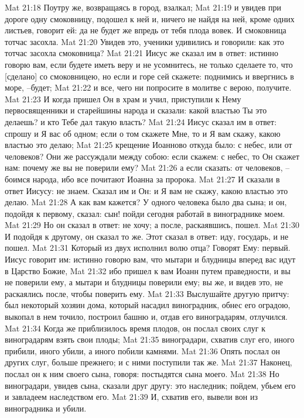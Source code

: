 Mat 21:18  Поутру же, возвращаясь в город, взалкал;
Mat 21:19  и увидев при дороге одну смоковницу, подошел к ней и, ничего не найдя на ней, кроме одних листьев, говорит ей: да не будет же впредь от тебя плода вовек. И смоковница тотчас засохла.
Mat 21:20  Увидев это, ученики удивились и говорили: как это тотчас засохла смоковница?
Mat 21:21  Иисус же сказал им в ответ: истинно говорю вам, если будете иметь веру и не усомнитесь, не только сделаете то, что [сделано] со смоковницею, но если и горе сей скажете: поднимись и ввергнись в море, --будет;
Mat 21:22  и все, чего ни попросите в молитве с верою, получите.
Mat 21:23  И когда пришел Он в храм и учил, приступили к Нему первосвященники и старейшины народа и сказали: какой властью Ты это делаешь? и кто Тебе дал такую власть?
Mat 21:24  Иисус сказал им в ответ: спрошу и Я вас об одном; если о том скажете Мне, то и Я вам скажу, какою властью это делаю;
Mat 21:25  крещение Иоанново откуда было: с небес, или от человеков? Они же рассуждали между собою: если скажем: с небес, то Он скажет нам: почему же вы не поверили ему?
Mat 21:26  а если сказать: от человеков, --боимся народа, ибо все почитают Иоанна за пророка.
Mat 21:27  И сказали в ответ Иисусу: не знаем. Сказал им и Он: и Я вам не скажу, какою властью это делаю.
Mat 21:28  А как вам кажется? У одного человека было два сына; и он, подойдя к первому, сказал: сын! пойди сегодня работай в винограднике моем.
Mat 21:29  Но он сказал в ответ: не хочу; а после, раскаявшись, пошел.
Mat 21:30  И подойдя к другому, он сказал то же. Этот сказал в ответ: иду, государь, и не пошел.
Mat 21:31  Который из двух исполнил волю отца? Говорят Ему: первый. Иисус говорит им: истинно говорю вам, что мытари и блудницы вперед вас идут в Царство Божие,
Mat 21:32  ибо пришел к вам Иоанн путем праведности, и вы не поверили ему, а мытари и блудницы поверили ему; вы же, и видев это, не раскаялись после, чтобы поверить ему.
Mat 21:33  Выслушайте другую притчу: был некоторый хозяин дома, который насадил виноградник, обнес его оградою, выкопал в нем точило, построил башню и, отдав его виноградарям, отлучился.
Mat 21:34  Когда же приблизилось время плодов, он послал своих слуг к виноградарям взять свои плоды;
Mat 21:35  виноградари, схватив слуг его, иного прибили, иного убили, а иного побили камнями.
Mat 21:36  Опять послал он других слуг, больше прежнего; и с ними поступили так же.
Mat 21:37  Наконец, послал он к ним своего сына, говоря: постыдятся сына моего.
Mat 21:38  Но виноградари, увидев сына, сказали друг другу: это наследник; пойдем, убьем его и завладеем наследством его.
Mat 21:39  И, схватив его, вывели вон из виноградника и убили.
